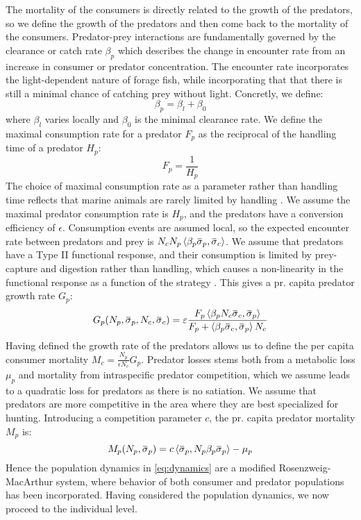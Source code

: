 The mortality of the consumers is directly related to the growth of the predators, so we define the growth of the predators and then come back to the mortality of the consumers. Predator-prey interactions are fundamentally governed by the clearance or catch rate $\beta_p$ which describes the change in encounter rate from an increase in consumer or predator concentration. The encounter rate incorporates the light-dependent nature of forage fish, while incorporating that that there is still a minimal chance of catching prey without light. Concretly, we define:
\begin{equation*}
  \beta_p = \beta_{l} + \beta_0
\end{equation*}
where $\beta_l$ varies locally and $\beta_0$ is the minimal clearance rate. We define the maximal consumption rate for a predator $F_p$ as the reciprocal of the handling time of a predator $H_p$:
\begin{equation}
  F_p = \frac{1}{H_p}
\end{equation}
The choice of maximal consumption rate as a parameter rather than handling time reflects that marine animals are rarely limited by handling \citep{schadegg2017satiation}.
We assume the maximal predator consumption rate is $H_p$, and the predators have a conversion efficiency of $\epsilon$. Consumption events are assumed local, so the expected encounter rate between predators and prey is $N_c N_p \ip{\beta_p \overbar{\sigma}_p}{\overbar{\sigma}_c}$. We assume that predators have a Type II functional response, and their consumption is limited by prey-capture and digestion rather than handling, which causes a non-linearity in the functional response as a function of the strategy \citep{Kioerboe2018}. This gives a pr. capita predator growth rate $G_p$:
\begin{equation}
  G_p(N_p, \overbar{\sigma}_p, N_c, \overbar{\sigma}_c )= \epsilon\frac{F_p\ip{\beta_p N_c\overbar{\sigma}_c}{\overbar{\sigma}_p} }{F_p + \ip{\beta_p \overbar{\sigma}_c}{\overbar{\sigma}_p} N_c}
\end{equation}
Having defined the growth rate of the predators allows us to define the per capita consumer mortality $M_c = \frac{N_p}{\epsilon N_c}G_p$. Predator losses stems both from a metabolic loss $\mu_p$ and mortality from intraspecific predator competition, which we assume leads to a quadratic loss for predators as there is no satiation. We assume that predators are more competitive in the area where they are best specialized for hunting. Introducing a competition parameter $c$, the pr. capita predator mortality $M_p$ is:
\begin{equation}
  M_p(N_p, \overbar{\sigma}_p) =  c \ip{\overbar{\sigma}_p}{N_p\beta_p \overbar{\sigma}_p}  - \mu_p
\end{equation}
Hence the population dynamics in \cref{eq:dynamics} are a modified Rosenzweig-MacArthur system, where behavior of both consumer and predator populations has been incorporated. Having considered the population dynamics, we now proceed to the individual level.
